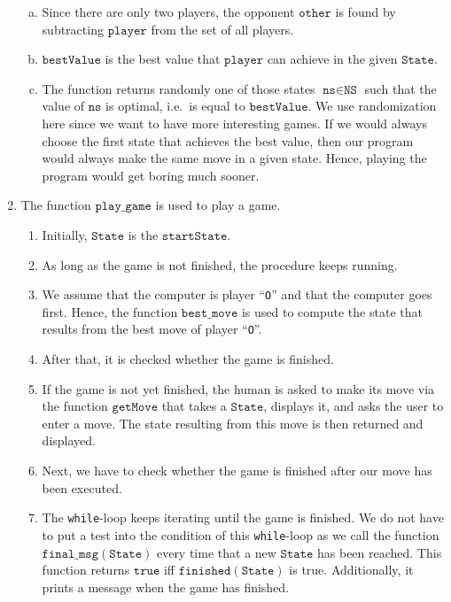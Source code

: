 \begin{enumerate}
\begin{enumerate}[(a)]
      \item Since there are only two players, the opponent $\texttt{other}$ is found by subtracting
            $\texttt{player}$ from the set of all players.
      \item $\texttt{bestValue}$ is the best value that $\texttt{player}$ can achieve in the given $\texttt{State}$.
      \item The function returns randomly one of those states $\texttt{ns} \in \texttt{NS}$ such that 
            the value of $\texttt{ns}$ is optimal, i.e.~is equal to $\texttt{bestValue}$.
            We use randomization here since we want to have more interesting games.  If we would always choose
            the first state that achieves the best value, then our program would always make the same move in
            a given state.  Hence, playing the program would get boring much sooner.
      \end{enumerate}
\item The function $\texttt{play\_game}$ is used to play a game.
      \begin{enumerate}
      \item Initially, $\texttt{State}$ is the $\texttt{startState}$.
      \item As long as the game is not finished, the procedure keeps running.
      \item We assume that the computer is player ``\texttt{O}'' and that the computer goes first.
            Hence, the function $\texttt{best\_move}$ is used to compute the state that results from the best
            move of player ``\texttt{O}''.
      \item After that, it is checked whether the game is finished.
      \item If the game is not  yet finished, the human is asked to make its move via the function
            $\texttt{getMove}$ that takes a $\texttt{State}$, displays it, and asks the user to enter a move.
            The state resulting from this move is then returned and displayed.
      \item Next, we have to check whether the game is finished after our move has been executed.
      \item The \texttt{while}-loop keeps iterating until the game is finished.
            We do not have to put a test into the condition of this \texttt{while}-loop as we call the function
            $\texttt{final\_msg}(\texttt{State})$ every time that a new $\texttt{State}$ has been reached.
            This function returns $\texttt{true}$ iff $\texttt{finished}(\texttt{State})$ is true.
            Additionally, it prints a message when the game has finished.
      \end{enumerate}
\end{enumerate}

